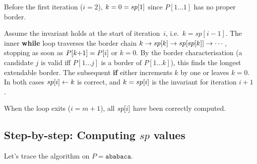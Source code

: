 \begin{formaldetails}
  \begin{loopproof}
    \item[Base case]     Before the first iteration ($i=2$), $k=0=sp\kern0pt[1]$
                         since $P[1\ldots 1]$ has no proper border. \checkmark
    \item[Preservation]  Assume the invariant holds at the start of iteration~$i$,
                         i.e.\ $k=sp[i{-}1]$.
                         The inner \textbf{while} loop traverses the border chain
                         $k \to sp\kern0pt[k] \to sp[sp\kern0pt[k]] \to \cdots$, stopping as soon
                         as $P[k{+}1]=P\kern0pt[i]$ or $k=0$.
                         By the border characterisation (a candidate $j$ is valid iff
                         $P[1\ldots j]$ is a border of $P[1\ldots k]$), this finds
                         the longest extendable border.
                         The subsequent \textbf{if} either increments $k$ by one or
                         leaves $k=0$.
                         In both cases $sp\kern0pt[i] \gets k$ is correct, and $k=sp\kern0pt[i]$
                         is the invariant for iteration $i{+}1$. \checkmark
    \item[Postcondition] When the loop exits ($i=m+1$), all $sp\kern0pt[i]$ have been
                         correctly computed. \checkmark
  \end{loopproof}
\end{formaldetails}

\subsection*{Step-by-step: Computing $sp$ values}

Let's trace the algorithm on $P = \texttt{ababaca}$.

